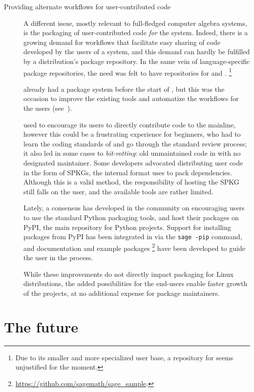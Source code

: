 \documentclass{deliverablereport}
\begin{document}
\begin{description}
\item[Providing alternate workflows for user-contributed code]
  A different issue, mostly relevant to full-fledged computer
  algebra systems, is the packaging of user-contributed code
  \emph{for} the system. %
  Indeed, there is a growing demand for workflows that facilitate easy
  sharing of code developed by the users of a system, and this demand can
  hardly be fulfilled by a distribution's package repository. %
  In the same vein of language-specific package repositories, the need
  was felt to have repositories for \Sage and \GAP.%
  \footnote{Due to its smaller and more specialized user base, a
    repository for \PariGP seems unjustified for the moment.} %
  
  \GAP already had a package system before the start of \ODK, but this
  was the occasion to improve the existing tools and automatize the
  workflows for the users (see~).

  \Sage used to encourage its users to directly contribute code to the
  mainline, however this could be a frustrating experience for
  beginners, who had to learn the coding standards of \Sage and go
  through the standard review process; it also led in some cases to
  \emph{bit-rotting}: old unmaintained code in \Sage with no designated
  maintainer. %
  Some \Sage developers advocated distributing user code in the form
  of SPKGs, the internal format \Sage uses to pack dependencies. %
  Although this is a valid method, the responsibility of hosting the
  SPKG still falls on the user, and the available tools are rather
  limited. %
  
  Lately, a consensus has developed in the community on encouraging
  users to use the standard Python packaging tools, and host their
  packages on PyPI, the main repository for Python projects. %
  Support for installing packages from PyPI has been integrated in
  \Sage via the \texttt{sage -pip} command, and documentation and
  example packages%
  \footnote{\url{https://github.com/sagemath/sage_sample}.}%
  have been developed to guide the user in the process.

  While these improvements do not directly impact packaging for Linux
  distributions, the added possibilities for the end-users enable
  faster growth of the projects, at no additional expense for package
  maintainers.
\end{description}

\section{The future}
\end{document}
